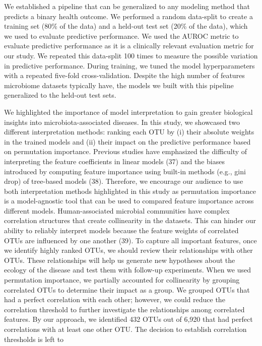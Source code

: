 \documentclass[
  11pt,
]{article}
\begin{document}
We established a pipeline that can be generalized to any modeling method
that predicts a binary health outcome. We performed a random data-split
to create a training set (80\% of the data) and a held-out test set
(20\% of the data), which we used to evaluate predictive performance. We
used the AUROC metric to evaluate predictive performance as it is a
clinically relevant evaluation metric for our study. We repeated this
data-split 100 times to measure the possible variation in predictive
performance. During training, we tuned the model hyperparameters with a
repeated five-fold cross-validation. Despite the high number of features
microbiome datasets typically have, the models we built with this
pipeline generalized to the held-out test sets.

We highlighted the importance of model interpretation to gain greater
biological insights into microbiota-associated diseases. In this study,
we showcased two different interpretation methods: ranking each OTU by
(i) their absolute weights in the trained models and (ii) their impact
on the predictive performance based on permutation importance. Previous
studies have emphasized the difficulty of interpreting the feature
coefficients in linear models (37) and the biases introduced by
computing feature importance using built-in methods (e.g., gini drop) of
tree-based models (38). Therefore, we encourage our audience to use both
interpretation methods highlighted in this study as permutation
importance is a model-agnostic tool that can be used to compared feature
importance across different models. Human-associated microbial
communities have complex correlation structures that create collinearity
in the datasets. This can hinder our ability to reliably interpret
models because the feature weights of correlated OTUs are influenced by
one another (39). To capture all important features, once we identify
highly ranked OTUs, we should review their relationships with other
OTUs. These relationships will help us generate new hypotheses about the
ecology of the disease and test them with follow-up experiments. When we
used permutation importance, we partially accounted for collinearity by
grouping correlated OTUs to determine their impact as a group. We
grouped OTUs that had a perfect correlation with each other; however, we
could reduce the correlation threshold to further investigate the
relationships among correlated features. By our approach, we identified
432 OTUs out of 6,920 that had perfect correlations with at least one
other OTU. The decision to establish correlation thresholds is left to
\end{document}
